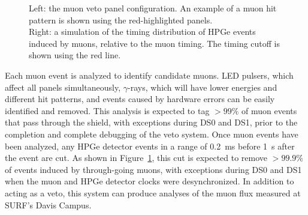 \documentclass[/main.tex]{subfiles}
\begin{document}
\begin{figure}
  \centering
  \caption[Muon veto system]{\label{fig:muonveto}
    Left: the muon veto panel configuration. An example of a muon hit pattern is shown using the red-highlighted panels.\\
    Right: a simulation of the timing distribution of HPGe events induced by muons, relative to the muon timing. The timing cutoff is shown using the red line.
  }
\end{figure}
Each muon event is analyzed to identify candidate muons.
LED pulsers, which affect all panels simultaneously, $\gamma$-rays, which will have lower energies and different hit patterns, and events caused by hardware errors can be easily identified and removed.
This analysis is expected to tag $>99\%$ of muon events that pass through the shield, with exceptions during DS0 and DS1, prior to the completion and complete debugging of the veto system.
Once muon events have been analyzed, any HPGe detector events in a range of 0.2~ms before 1~s after the event are cut.
As shown in Figure~\ref{fig:muonveto}, this cut is expected to remove $>99.9\%$ of events induced by through-going muons, with exceptions during DS0 and DS1 when the muon and HPGe detector clocks were desynchronized.
In addition to acting as a veto, this system can produce analyses of the muon flux measured at SURF's Davis Campus\cite{mjdmuonflux}.
\end{document}
